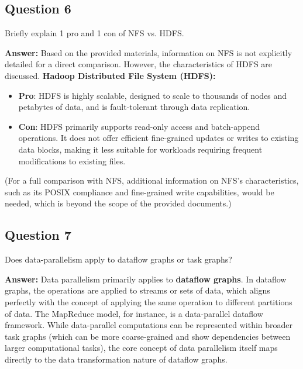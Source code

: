 \documentclass{article}
\begin{document}
\subsection*{Question 6}
Briefly explain 1 pro and 1 con of NFS vs. HDFS. 

\textbf{Answer:}
Based on the provided materials, information on NFS is not explicitly detailed for a direct comparison. However, the characteristics of HDFS are discussed.
\textbf{Hadoop Distributed File System (HDFS):}
\begin{itemize}
    \item \textbf{Pro}: HDFS is highly scalable, designed to scale to thousands of nodes and petabytes of data, and is fault-tolerant through data replication.
    \item \textbf{Con}: HDFS primarily supports read-only access and batch-append operations. It does not offer efficient fine-grained updates or writes to existing data blocks, making it less suitable for workloads requiring frequent modifications to existing files.
\end{itemize}
(For a full comparison with NFS, additional information on NFS's characteristics, such as its POSIX compliance and fine-grained write capabilities, would be needed, which is beyond the scope of the provided documents.)

\subsection*{Question 7}
Does data-parallelism apply to dataflow graphs or task graphs? 

\textbf{Answer:}
Data parallelism primarily applies to \textbf{dataflow graphs}. In dataflow graphs, the operations are applied to streams or sets of data, which aligns perfectly with the concept of applying the same operation to different partitions of data. The MapReduce model, for instance, is a data-parallel dataflow framework. While data-parallel computations can be represented within broader task graphs (which can be more coarse-grained and show dependencies between larger computational tasks), the core concept of data parallelism itself maps directly to the data transformation nature of dataflow graphs.
\end{document}
